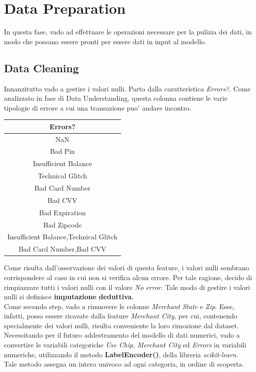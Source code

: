 \documentclass[]{article}
\begin{document}
\section{Data Preparation}
    In questa fase, vado ad effettuare le operazioni necessare per la pulizia dei dati, in modo che possano essere pronti per essere dati in input al modello.
    \subsection{Data Cleaning}
        Innanzitutto vado a gestire i valori nulli. Parto dalla caratteristica \textit{Errors?}. Come analizzato in fase di Data Understanding, questa colonna contiene le varie tipologie di errore a cui una transazione puo' andare incontro.
        \begin{center}
            \begin{tabular}{|c|}
                \hline
                \textbf{Errors?}\\
                \hline
                NaN\\
                \hline
                Bad Pin\\
                \hline
                Insufficient Balance\\
                \hline
                Technical Glitch\\
                \hline
                Bad Card Number\\
                \hline
                Bad CVV\\
                \hline
                Bad Expiration\\
                \hline
                Bad Zipcode\\
                \hline
                Insufficient Balance,Technical Glitch\\
                \hline
                Bad Card Number,Bad CVV\\
                \hline
            \end{tabular}
        \end{center}
        Come risulta dall'osservazione dei valori di questa feature, i valori nulli sembrano corrispondere al caso in cui non si verifica alcun errore. Per tale ragione, decido di rimpiazzare tutti i valori nulli con il valore \textit{No error}. Tale modo di gestire i valori nulli si definisce \textbf{imputazione deduttiva}.\\
        Come secondo step, vado a rimuovere le colonne \textit{Merchant State} e \textit{Zip}. Esse, infatti, posso essere ricavate dalla feature \textit{Merchant City}, per cui, contenendo specialmente dei valori nulli, risulta conveniente la loro rimozione dal dataset.\\
        Necessitando per il futuro addestramento del modello di dati numerici, vado a convertire le variabili categoriche \textit{Use Chip}, \textit{Merchant City} ed \textit{Errors} in variabili numeriche, utilizzando il metodo \textbf{LabelEncoder()}, della libreria \textit{scikit-learn}. Tale metodo assegna un intero univoco ad ogni categoria, in ordine di scoperta.
\end{document}
